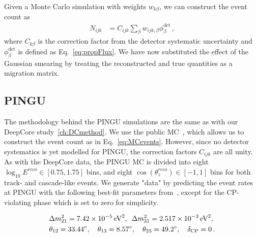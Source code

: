 \documentclass[draft=True]{revtex4-2}
\newcommand{\zreco}{\ensuremath{\cos{(\theta_z^{reco})}}}
\begin{document}
Given a Monte Carlo simulation with weights $w_{k\beta}$, we can construct the event count as
\begin{align}\label{eq:MCevents}
    N_{ijk} &= C_{ijk}\sum_{\beta}w_{ijk,\beta} \phi_\beta^\text{det}\,,
\end{align}
where $C_{k\beta}$ is the correction factor from the detector systematic uncertainty and $\phi_\beta^\text{det}$ is defined as Eq.~\ref{eq:propFlux}. We have now substituted the effect of the Gaussian smearing 
by treating the reconstructed and true quantities as a migration matrix. 

\subsection{PINGU}\label{ch:PINGUmethod}
The methodology behind the PINGU simulations are the same as with our DeepCore study~\ref{ch:DCmethod}. We use the public MC~\cite{PINGUdata}, which allows us to construct the event count as in Eq.~\ref{eq:MCevents}.
However, since no detector systematics is yet modelled for PINGU, the correction factors $C_{ijk}$ are all unity.
As with the DeepCore data, the PINGU MC is divided into eight 
$\log_{10}E^{reco} \in [0.75,1.75]$ bins, and eight $\zreco \in [-1,1]$ bins for both track- and cascade-like events. 
We generate "data" by predicting the event rates at PINGU with the following best-fit parameters from~\cite{nufit}, except for the CP-violating phase which is set to zero for simplicity.

\begin{align}\label{eq:PINGUparams}
    &\Delta m^2_{21} =  \SI{7.42e-5}{\electronvolt^2},\hspace{0.5em} \Delta m^2_{31} =  \SI{2.517e-3}{\electronvolt^2}, \nonumber \\
    &\theta_{12} = \SI{33.44}{\degree},\hspace{1em} \theta_{13} = \SI{8.57}{\degree},\hspace{1em} \theta_{23} = \SI{49.2}{\degree}, \hspace{1em} \delta_\text{CP} = 0\,.
\end{align}
\end{document}
